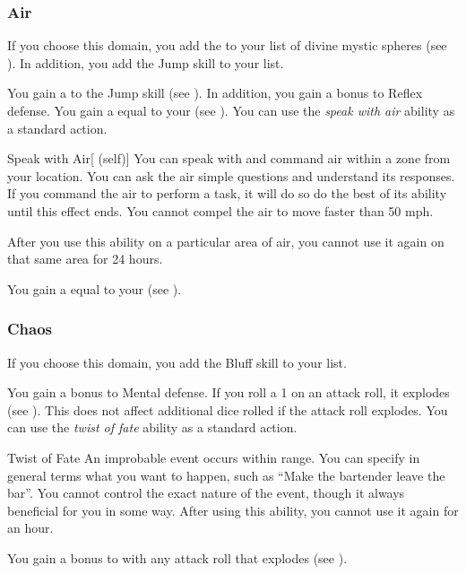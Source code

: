         \subsubsection{Air}
            If you choose this domain, you add the   to your list of divine mystic spheres (see ).
            In addition, you add the Jump skill to your  list.

             You gain a   to the Jump skill (see ).
            In addition, you gain a  bonus to Reflex defense.
             You gain a  equal to your  (see ).
             You can use the \textit{speak with air} ability as a standard action.
            \begin{attuneability}{Speak with Air}[ (self)]
                You can speak with and command air within a \areahuge zone from your location.
                You can ask the air simple questions and understand its responses.
                If you command the air to perform a task, it will do so do the best of its ability until this effect ends.
                You cannot compel the air to move faster than 50 mph.

                After you use this ability on a particular area of air, you cannot use it again on that same area for 24 hours.
            \end{attuneability}
             You gain a  equal to your  (see ).

        \subsubsection{Chaos}
            If you choose this domain, you add the Bluff skill to your  list.

             You gain a  bonus to Mental defense.
             If you roll a 1 on an attack roll, it explodes (see ).
            This does not affect additional dice rolled if the attack roll explodes.
             You can use the \textit{twist of fate} ability as a standard action.
            \begin{apability}{Twist of Fate}
                An improbable event occurs within \rnglong range.
                You can specify in general terms what you want to happen, such as ``Make the bartender leave the bar''.
                You cannot control the exact nature of the event, though it always beneficial for you in some way.
                After using this ability, you cannot use it again for an hour.
            \end{apability}
             You gain a  bonus to  with any attack roll that explodes (see ).


